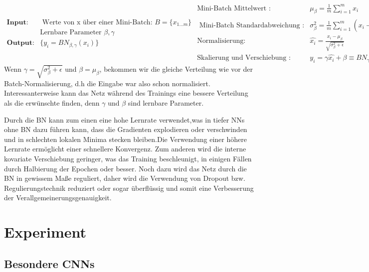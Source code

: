 \documentclass[12pt,a4paper]{scrartcl}
\numberwithin{equation}{section}
\begin{document}
\begin{subequations}
	 \begin{align*}
		\textbf{Input:} & \text{  Werte von x über einer Mini-Batch: } B=\{x_{1...m}\}\\
		& \text{Lernbare Parameter  } \beta, \gamma \\
		\textbf{Output:} & \{ y_i = BN_{\beta, \gamma}(x_i)\}
	\end{align*}
	\begin{align}
		\text{Mini-Batch Mittelwert  : } &\mu_\beta=\frac{1}{m}\sum_{i = 1}^{m}x_i \\
		\text{ Mini-Batch Standardabweichung :} &\sigma_\beta^2=\frac{1}{m}\sum_{i = 1}^{m}(x_i- \mu_\beta)^2 \\
		 \text{Normalisierung:} & \widehat{x_i} = \frac{x_i - \mu_\beta}{\sqrt{\sigma_\beta^2 + \epsilon}} \\
		 \text{Skalierung und Verschiebung :} & {y_i} = \gamma\widehat{x_i} + \beta \equiv BN_{\gamma, \beta}
	\end{align}
	\label{BNA}
\end{subequations}
Wenn $\gamma = \sqrt{\sigma_\beta^2 + \epsilon}$ und $\beta = \mu_\beta $, bekommen wir die gleiche Verteilung wie vor der Batch-Normalisierung, d.h die Eingabe war also schon normalisiert. Interessanterweise kann das Netz während des Trainings eine bessere Verteilung als die erwünschte finden, denn $\gamma$ und $\beta$ sind lernbare Parameter.

 Durch die BN kann zum einen eine hohe Lernrate verwendet,was in tiefer \acsp{NN} ohne BN dazu führen kann, dass die Gradienten explodieren oder verschwinden und in schlechten lokalen Minima stecken bleiben.Die Verwendung einer höhere Lernrate ermöglicht einer schnellere Konvergenz.
 Zum anderen wird die interne kovariate Verschiebung geringer, was das Training beschleunigt, in einigen Fällen durch Halbierung der Epochen oder besser. Noch dazu wird das Netz durch die BN in gewissem Maße reguliert, daher wird die Verwendung von Dropout bzw. Regulierungstechnik reduziert oder sogar überflüssig und somit eine Verbesserung der Verallgemeinerungsgenauigkeit.



\section{Experiment} \label{Experiment}



 \subsection{Besondere \acsp{CNN}}
\end{document}
